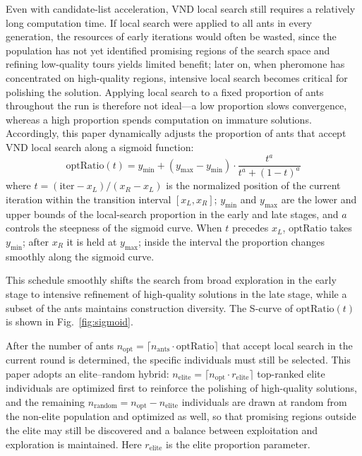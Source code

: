 \documentclass[pdflatex,sn-basic,Numbered]{sn-jnl}
\begin{document}
Even with candidate-list acceleration, VND local search still requires a relatively long computation time. If local search were applied to all ants in every generation, the resources of early iterations would often be wasted, since the population has not yet identified promising regions of the search space and refining low-quality tours yields limited benefit; later on, when pheromone has concentrated on high-quality regions, intensive local search becomes critical for polishing the solution. Applying local search to a fixed proportion of ants throughout the run is therefore not ideal---a low proportion slows convergence, whereas a high proportion spends computation on immature solutions. Accordingly, this paper dynamically adjusts the proportion of ants that accept VND local search along a sigmoid function:
\begin{equation}
\mathrm{optRatio}(t) = y_{\min} + (y_{\max} - y_{\min}) \cdot \frac{t^{a}}{t^{a} + (1 - t)^{a}}
\label{eq:sigmoid}
\end{equation}
where $t = (\mathrm{iter} - x_L) / (x_R - x_L)$ is the normalized position of the current iteration within the transition interval $[x_L, x_R]$; $y_{\min}$ and $y_{\max}$ are the lower and upper bounds of the local-search proportion in the early and late stages, and $a$ controls the steepness of the sigmoid curve. When $t$ precedes $x_L$, $\mathrm{optRatio}$ takes $y_{\min}$; after $x_R$ it is held at $y_{\max}$; inside the interval the proportion changes smoothly along the sigmoid curve.

This schedule smoothly shifts the search from broad exploration in the early stage to intensive refinement of high-quality solutions in the late stage, while a subset of the ants maintains construction diversity. The S-curve of $\mathrm{optRatio}(t)$ is shown in Fig.~\ref{fig:sigmoid}.

After the number of ants $n_{\mathrm{opt}} = \lceil n_{\mathrm{ants}} \cdot \mathrm{optRatio} \rceil$ that accept local search in the current round is determined, the specific individuals must still be selected. This paper adopts an elite--random hybrid: $n_{\mathrm{elite}} = \lceil n_{\mathrm{opt}} \cdot r_{\mathrm{elite}} \rceil$ top-ranked elite individuals are optimized first to reinforce the polishing of high-quality solutions, and the remaining $n_{\mathrm{random}} = n_{\mathrm{opt}} - n_{\mathrm{elite}}$ individuals are drawn at random from the non-elite population and optimized as well, so that promising regions outside the elite may still be discovered and a balance between exploitation and exploration is maintained. Here $r_{\mathrm{elite}}$ is the elite proportion parameter.
\end{document}
